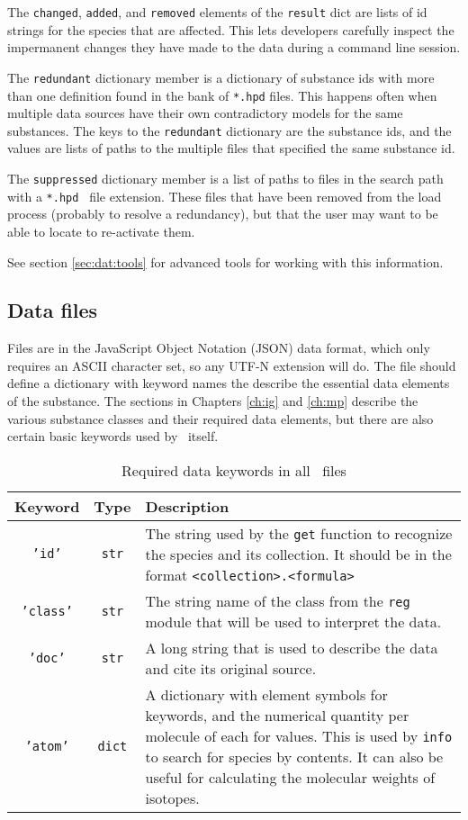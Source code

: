 The \texttt{changed}, \texttt{added}, and \texttt{removed} elements of the \texttt{result} dict are lists of id strings for the species that are affected.  This lets developers carefully inspect the impermanent changes they have made to the data during a command line session.

The \texttt{redundant} dictionary member is a dictionary of substance ids with more than one definition found in the bank of \texttt{*.hpd} files.  This happens often when multiple data sources have their own contradictory models for the same substances.  The keys to the \texttt{redundant} dictionary are the substance ids, and the values are lists of paths to the multiple files that specified the same substance id.

The \texttt{suppressed} dictionary member is a list of paths to files in the search path with a \texttt{*.hpd~} file extension.  These files that have been removed from the load process (probably to resolve a redundancy), but that the user may want to be able to locate to re-activate them.

See section \ref{sec:dat:tools} for advanced tools for working with this information.

\subsection{Data files}\label{sec:dat:hpd}

Files are in the JavaScript Object Notation (JSON) data format, which only requires an ASCII character set, so any UTF-N extension will do.  The file should define a dictionary with keyword names the describe the essential data elements of the substance.  The sections in Chapters \ref{ch:ig} and \ref{ch:mp} describe the various substance classes and their required data elements, but there are also certain basic keywords used by \PM\ itself.

\begin{table}
\centering
\caption{Required data keywords in all \PM\ files}\label{tab:dat:required}
\begin{tabular}{|ccp{2.5in}|}
\hline
Keyword & Type & Description\\
\hline
\texttt{'id'} & \texttt{str} & The string used by the \texttt{get} function to recognize the species and its collection.  It should be in the format \texttt{<collection>.<formula>}\\
\texttt{'class'} & \texttt{str} & The string name of the class from the \texttt{reg} module that will be used to interpret the data.\\
\texttt{'doc'} & \texttt{str} & A long string that is used to describe the data and cite its original source.\\
\texttt{'atom'} & \texttt{dict} & A dictionary with element symbols for keywords, and the numerical quantity per molecule of each for values.  This is used by \texttt{info} to search for species by contents.  It can also be useful for calculating the molecular weights of isotopes.\\
\hline
\end{tabular}
\end{table}

